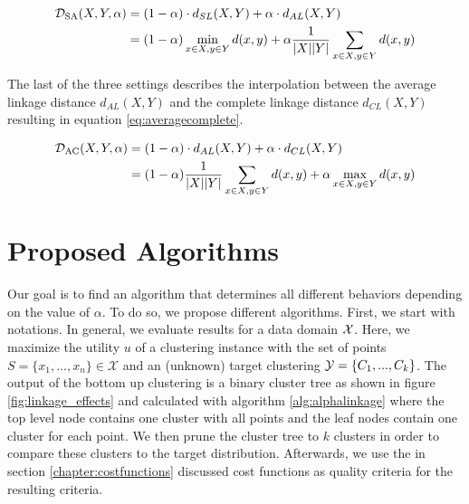 \begin{equation}
    \begin{aligned}
        \mathcal{D}_\text{SA}(X,Y,\alpha) &= (1 - \alpha) \cdot d_{SL}(X,Y) + \alpha \cdot d_{AL}(X,Y)\\
        &= (1 - \alpha) \min\limits_{x \in X, y \in Y} d(x,y) + \alpha \frac{1}{|X| |Y|}\sum\limits_{x \in X, y \in Y} d(x,y)
    \end{aligned}
    \label{eq:singleaverage}
\end{equation}

The last of the three settings describes the interpolation between the average linkage distance $d_{AL}(X,Y)$ and the complete linkage distance $d_{CL}(X,Y)$ resulting in equation \ref{eq:averagecomplete}.

\begin{equation}
    \begin{aligned}
        \mathcal{D}_\text{AC}(X,Y,\alpha) &= (1 - \alpha) \cdot d_{AL}(X,Y) + \alpha \cdot d_{CL}(X,Y)\\
        &= (1 - \alpha) \frac{1}{|X| |Y|}\sum\limits_{x \in X, y \in Y} d(x,y) + \alpha \max\limits_{x \in X, y \in Y} d(x,y)
    \end{aligned}
    \label{eq:averagecomplete}
\end{equation}


\section{Proposed Algorithms}

Our goal is to find an algorithm that determines all different behaviors depending on the value of $\alpha$. To do so, we propose different algorithms. First, we start with notations. In general, we evaluate results for a data domain $\mathcal{X}$. Here, we maximize the utility $u$ of a clustering instance with the set of points $S = \{x_1, ..., x_n\} \in \mathcal{X}$ and an (unknown) target clustering $\mathcal{Y} = \{C_1, ..., C_k\}$. The output of the bottom up clustering is a binary cluster tree as shown in figure \ref{fig:linkage_effects} and calculated with algorithm \ref{alg:alphalinkage} where the top level node contains one cluster with all points and the leaf nodes contain one cluster for each point. We then prune the cluster tree to $k$ clusters in order to compare these clusters to the target distribution. Afterwards, we use the in section \ref{chapter:costfunctions} discussed cost functions as quality criteria for the resulting criteria.


